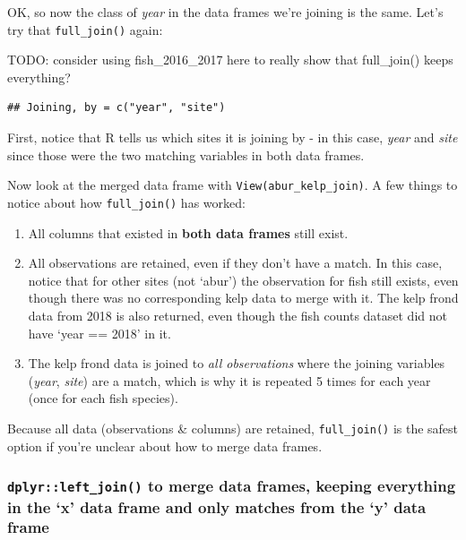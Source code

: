 \documentclass[]{book}
\newenvironment{Shaded}{\begin{snugshade}}{\end{snugshade}}
\newcommand{\DecValTok}[1]{\textcolor[rgb]{0.00,0.00,0.81}{#1}}
\newcommand{\KeywordTok}[1]{\textcolor[rgb]{0.13,0.29,0.53}{\textbf{#1}}}
\newcommand{\NormalTok}[1]{#1}
\newcommand{\OperatorTok}[1]{\textcolor[rgb]{0.81,0.36,0.00}{\textbf{#1}}}
\newcommand{\StringTok}[1]{\textcolor[rgb]{0.31,0.60,0.02}{#1}}
\providecommand{\tightlist}{%
  \setlength{\itemsep}{0pt}\setlength{\parskip}{0pt}}
\begin{document}
OK, so now the class of \emph{year} in the data frames we're joining is the same. Let's try that \texttt{full\_join()} again:

TODO: consider using fish\_2016\_2017 here to really show that full\_join() keeps everything?

\begin{Shaded}
\end{Shaded}

\begin{verbatim}
## Joining, by = c("year", "site")
\end{verbatim}

First, notice that R tells us which sites it is joining by - in this case, \emph{year} and \emph{site} since those were the two matching variables in both data frames.

Now look at the merged data frame with \texttt{View(abur\_kelp\_join)}. A few things to notice about how \texttt{full\_join()} has worked:

\begin{enumerate}
\def\labelenumi{\arabic{enumi}.}
\tightlist
\item
  All columns that existed in \textbf{both data frames} still exist.
\item
  All observations are retained, even if they don't have a match. In this case, notice that for other sites (not `abur') the observation for fish still exists, even though there was no corresponding kelp data to merge with it. The kelp frond data from 2018 is also returned, even though the fish counts dataset did not have `year == 2018' in it.
\item
  The kelp frond data is joined to \emph{all observations} where the joining variables (\emph{year}, \emph{site}) are a match, which is why it is repeated 5 times for each year (once for each fish species).
\end{enumerate}

Because all data (observations \& columns) are retained, \texttt{full\_join()} is the safest option if you're unclear about how to merge data frames.

\hypertarget{dplyrleft_join-to-merge-data-frames-keeping-everything-in-the-x-data-frame-and-only-matches-from-the-y-data-frame}{%
\subsubsection{\texorpdfstring{\texttt{dplyr::left\_join()} to merge data frames, keeping everything in the `x' data frame and only matches from the `y' data frame}{dplyr::left\_join() to merge data frames, keeping everything in the `x' data frame and only matches from the `y' data frame}}\label{dplyrleft_join-to-merge-data-frames-keeping-everything-in-the-x-data-frame-and-only-matches-from-the-y-data-frame}}
\end{document}
